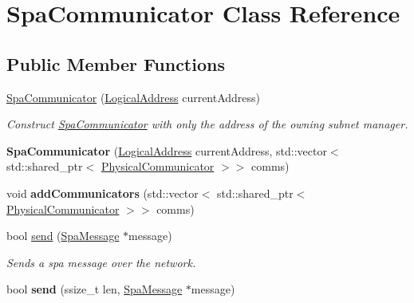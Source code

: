\hypertarget{classSpaCommunicator}{}\section{Spa\+Communicator Class Reference}
\label{classSpaCommunicator}
\subsection*{Public Member Functions}
\begin{DoxyCompactItemize}
\item 
\hyperlink{classSpaCommunicator_a4ed78daf6517b608f93dd894b65dab55}{Spa\+Communicator} (\hyperlink{structLogicalAddress}{Logical\+Address} current\+Address)
\begin{DoxyCompactList}\small\item\em Construct \hyperlink{classSpaCommunicator}{Spa\+Communicator} with only the address of the owning subnet manager. \end{DoxyCompactList}\item 
\mbox{\label{classSpaCommunicator_a09fa278da37e95831a04896ec24dd227}} 
{\bfseries Spa\+Communicator} (\hyperlink{structLogicalAddress}{Logical\+Address} current\+Address, std\+::vector$<$ std\+::shared\+\_\+ptr$<$ \hyperlink{classPhysicalCommunicator}{Physical\+Communicator} $>$$>$ comms)
\item 
\mbox{\label{classSpaCommunicator_a310ae62534090d112e8c3b2d024db83f}} 
void {\bfseries add\+Communicators} (std\+::vector$<$ std\+::shared\+\_\+ptr$<$ \hyperlink{classPhysicalCommunicator}{Physical\+Communicator} $>$$>$ comms)
\item 
\mbox{\label{classSpaCommunicator_a4a6decf46398e6a749767d75e429c263}} 
bool \hyperlink{classSpaCommunicator_a4a6decf46398e6a749767d75e429c263}{send} (\hyperlink{structSpaMessage}{Spa\+Message} $\ast$message)
\begin{DoxyCompactList}\small\item\em Sends a spa message over the network. \end{DoxyCompactList}\item 
\mbox{\label{classSpaCommunicator_a349e67dbbea6ee9abae289729a90f2ba}} 
bool {\bfseries send} (ssize\+\_\+t len, \hyperlink{structSpaMessage}{Spa\+Message} $\ast$message)

\end{DoxyCompactItemize}
